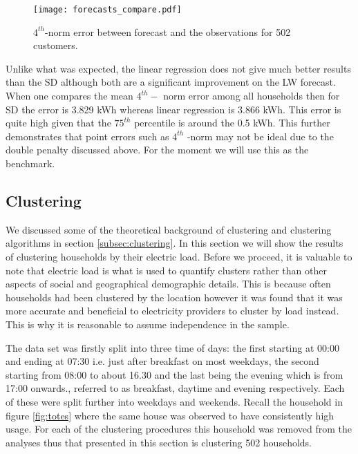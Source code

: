 \documentclass[a4paper]{article}
\begin{document}
\begin{figure}
\texttt{[image: forecasts\_compare.pdf]}
\caption{\label{fig:forecasts_compare} $4^{th}$-norm error between forecast and the observations for 502 customers.}
\end{figure}

Unlike what was expected, the linear regression does not give much better results than the SD although both are a significant improvement on the LW forecast. When one compares the mean $4^{th}-$ norm error among all households then for SD the error is 3.829 kWh whereas linear regression is 3.866 kWh. This error is quite high given that the $75^{th}$ percentile is around the 0.5 kWh. This further demonstrates that point errors such as $4^{th}$ -norm may not be ideal due to the double penalty discussed above. For the moment we will use this as the benchmark.



\subsection{Clustering} \label{subsec:clus_res}
We discussed some of the theoretical background of clustering and clustering algorithms in section \ref{subsec:clustering}. In this section we will show the results of clustering households by their electric load. Before we proceed, it is valuable to note that electric load is what is used to quantify clusters rather than other aspects of social and geographical demographic details. This is because often households had been clustered by the location however it was found  that it was more accurate and beneficial to electricity providers to cluster by load instead. This is why it is reasonable to assume independence in the sample.

The data set was firstly split into three time of days: the first starting at 00:00 and ending at 07:30 i.e. just after breakfast on most weekdays, the second starting from 08:00 to about 16.30 and the last being the evening which is from 17:00 onwards., referred to as breakfast, daytime and evening respectively. Each of these were split further into weekdays and weekends. Recall the household in figure \ref{fig:totes} where the same house was observed to have consistently high usage. For each of the clustering procedures this household was removed from the analyses thus that presented in this section is clustering 502 households.
\end{document}
